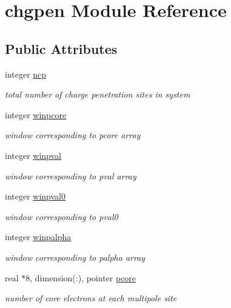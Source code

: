 \hypertarget{classchgpen}{\section{chgpen Module Reference}
\label{classchgpen}
}
\subsection*{Public Attributes}
\begin{DoxyCompactItemize}
\item 
integer \hyperlink{classchgpen_a0d389594b74c91aec7d51c5857af719b}{ncp}
\begin{DoxyCompactList}\small\item\em total number of charge penetration sites in system \end{DoxyCompactList}\item 
integer \hyperlink{classchgpen_ad3b954d2def93e4386c239ee5fc9a588}{winpcore}
\begin{DoxyCompactList}\small\item\em window corresponding to pcore array \end{DoxyCompactList}\item 
integer \hyperlink{classchgpen_a0c52f88ecb1d7385b90fc1a373d931db}{winpval}
\begin{DoxyCompactList}\small\item\em window corresponding to pval array \end{DoxyCompactList}\item 
integer \hyperlink{classchgpen_a0868dc9de1a487fd55dfe7983cb04386}{winpval0}
\begin{DoxyCompactList}\small\item\em window corresponding to pval0 \end{DoxyCompactList}\item 
integer \hyperlink{classchgpen_a84715553590bfaa7106de2d9824cd148}{winpalpha}
\begin{DoxyCompactList}\small\item\em window corresponding to palpha array \end{DoxyCompactList}\item 
real $\ast$8, dimension(\-:), pointer \hyperlink{classchgpen_a27ad91c13fa6216be0b9a9bff32c37b4}{pcore}
\begin{DoxyCompactList}\small\item\em number of core electrons at each multipole site \end{DoxyCompactList}\item 

\end{DoxyCompactItemize}
